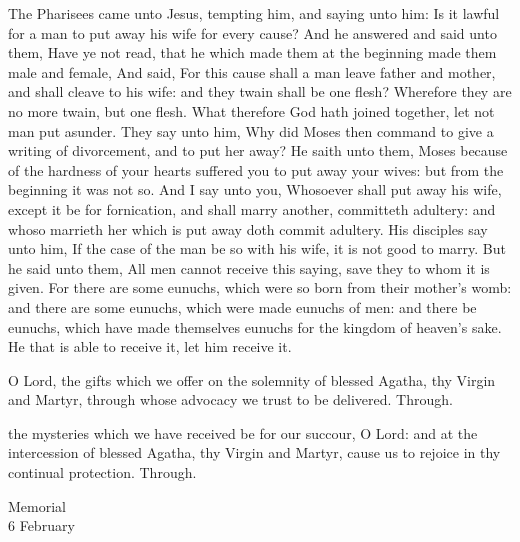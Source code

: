  The Pharisees came unto Jesus, tempting him, and saying unto him: Is it lawful for a man to put away his wife for every cause? And he answered and said unto them, Have ye not read, that he which made them at the beginning made them male and female, And said, For this cause shall a man leave father and mother, and shall cleave to his wife: and they twain shall be one flesh? Wherefore they are no more twain, but one flesh. What therefore God hath joined together, let not man put asunder. They say unto him, Why did Moses then command to give a writing of divorcement, and to put her away? He saith unto them, Moses because of the hardness of your hearts suffered you to put away your wives: but from the beginning it was not so. And I say unto you, Whosoever shall put away his wife, except it be for fornication, and shall marry another, committeth adultery: and whoso marrieth her which is put away doth commit adultery. His disciples say unto him, If the case of the man be so with his wife, it is not good to marry. But he said unto them, All men cannot receive this saying, save they to whom it is given. For there are some eunuchs, which were so born from their mother's womb: and there are some eunuchs, which were made eunuchs of men: and there be eunuchs, which have made themselves eunuchs for the kingdom of heaven's sake. He that is able to receive it, let him receive it.


\secret
{} O Lord, the gifts which we offer on the solemnity of blessed Agatha, thy Virgin and Martyr, through whose advocacy we trust to be delivered. Through.


\postcommunion
{} the mysteries which we have received be for our succour, O Lord: and at the intercession of blessed Agatha, thy Virgin and Martyr, cause us to rejoice in thy continual protection. Through.


\begin{inhead}
    {Memorial\\
6 February}
\end{inhead}

